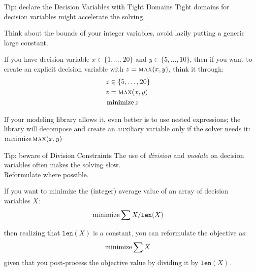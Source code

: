 \documentclass{cons-beamer}
\begin{document}
\begin{frame}{Tip: declare the Decision Variables with Tight
Domains}\label{tight}
\alert{Tight domains for decision variables might accelerate the
solving.} \vfill
\vspace{1em}

Think about the bounds of your integer variables, avoid lazily
putting a generic large constant.
\begin{example}
  If you have decision variable $x \in \{1, \dots, 20\}$ and $y \in
  \{5, \dots, 10\}$, then if you want to create an explicit
  decision variable with $z = \textsc{max}(x,y)$, think it through: \\
  \vspace{-1.5em}
  \begin{align*}
    & z \in \{5, \dots, 20\} \\
    & z = \textsc{max}(x,y)    \\
    & \operatorname*{minimize} z
  \end{align*}
  \vspace{-1.5em}

  If your modeling library allows it, even better is to use nested expressions; the library will decompose and create an auxiliary variable only if the solver needs it: \\
  \centering
  $\operatorname*{minimize} \textsc{max}(x,y)$
\end{example}
\end{frame}


\begin{frame}{Tip: beware of Division Constraints}
\alert{The use of \textit{division} and \textit{modulo} on decision
variables often makes the solving slow.} \\
Reformulate where possible.
\vfill

\begin{example}
  If you want to minimize the (integer) average value of an array
  of decision variables $X$:
  \[
    \operatorname*{minimize} \sum X / \mathtt{len}(X)
  \]

  then realizing that $\mathtt{len}(X)$ is a constant, you can
  reformulate the objective as:
  \[
    \operatorname*{minimize} \sum X
  \]
  given that you post-process the objective value by dividing it by
  $\mathtt{len}(X)$.
\end{example}
\end{frame}
\end{document}

